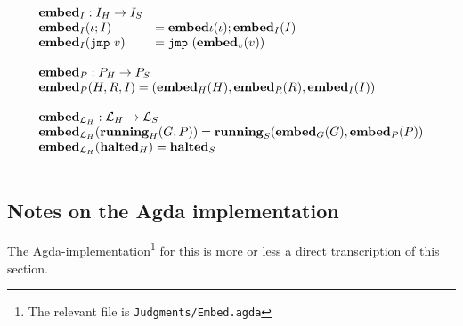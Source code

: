 {\[\begin{array}{l}
\begin{array}{ll}
{\ensuremath{\mathbf{embed}}}_I : {I_H} -> {I_S} \\
{\mathbf{embed}}_I(\iota ; I) &= {\mathbf{embed}}{\iota}(\iota) ; {\mathbf{embed}}_I(I) \\
{\mathbf{embed}}_I(\mathtt{jmp}\ v) &= \mathtt{jmp}\ ({\mathbf{embed}}_v(v))
\end{array} \\\\

\begin{array}{l}
{\ensuremath{\mathbf{embed}}}_P : {P_H} -> {P_S} \\
{\mathbf{embed}}_P(H, R, I) = ({\mathbf{embed}}_H(H), {\mathbf{embed}}_R(R), {\mathbf{embed}}_I(I)) \\\\

{\mathbf{embed}}_{\mathcal{L}_H} : \mathcal{L}_H -> \mathcal{L}_S \\
{\mathbf{embed}}_{\mathcal{L}_H}({\mathbf{running}_H}(G, P)) = {\mathbf{running}_S}({\mathbf{embed}}_G(G), {\mathbf{embed}}_P(P)) \\
{\mathbf{embed}}_{\mathcal{L}_H}({\mathbf{halted}_H}) = {\mathbf{halted}_S} \\
\end{array} \\\\

\end{array}\]
}

\subsection{Notes on the Agda implementation}

The Agda-implementation\footnote{The relevant file is
  \texttt{Judgments/Embed.agda}} for this is more or less a direct transcription
of this section.
